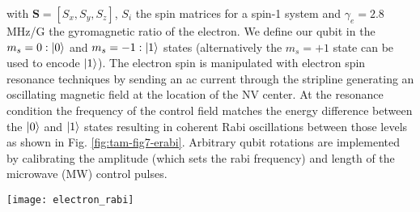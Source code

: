 with $\mathbf{S} =[S_x,S_y,S_z]$,  $S_i$ the spin matrices for a spin-1 system and $\gamma_e = 2.8$ MHz/G the gyromagnetic ratio of the electron. We define our qubit in the $m_s = 0 :\left|0\right>$ and $m_s = -1 : \left|1\right>$ states (alternatively the $m_s = + 1$ state can be used to encode $\left|1\right>$). The electron spin is manipulated with electron spin resonance techniques by sending an ac current through the stripline generating an oscillating magnetic field at the location of the NV center. At the resonance condition the frequency of the control field matches the energy difference between the $\left|0\right>$ and $\left|1\right>$ states resulting in coherent Rabi oscillations between those levels as shown in Fig. \ref{fig:tam-fig7-erabi}. Arbitrary qubit rotations are implemented by calibrating the amplitude (which sets the rabi frequency) and length of the microwave (MW) control pulses.

\label{sec:groundstatecontrol}
\begin{figure*}
	\centering
	\texttt{[image: electron\_rabi]}
	\caption{\label{fig:tam-fig7-erabi} \textbf{} (a) Coherent qubit rotations of the electron spin are performed by varying the length of a MW pulse. Solid line is a sinusoidal fit from which we determine the Rabi frequency $(7.67 \pm 0.02)$ MHz. (b) Ramsey measurements for two different NV centers where the wait time between two $\pi$/2 pulses is varied. From a fit to equation \ref{eq:tam-ramsey} we find $T_2^{*} = (0.96 \pm 0.03)$ and $(3.09 \pm 0.05) \mu$s for the upper and lower panel respectively. The coupling to the nitrogen spin is $A_{\parallel} = (2.20 \pm 0.01)$ and $(2.195 \pm 0.002) $MHz. For the bottom panel two additional frequency components are included in the fit to account for the strongly coupled $^{13}$C. We find a coupling strength of ($384 \pm 3$) kHz.  All datapoints are corrected to account for imperfect readout and initialization.}
\end{figure*}



